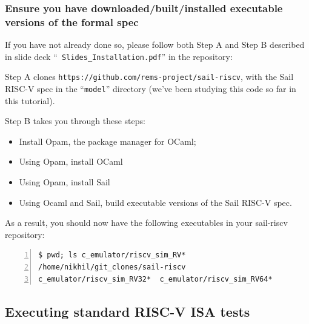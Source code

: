 \documentclass[aspectratio=169]{beamer}
\newcommand{\hmm}{\hspace*{2em}}
\newcommand{\slidefont}{\scriptsize}
\begin{document}

\begin{frame}[fragile]
  \frametitle{Ensure you have downloaded/built/installed executable versions of the formal spec}

  \label{reminder-download-install}

  \slidefont

  If you have not already done so, please follow both Step A and Step B described in slide deck ``{\tt
    Slides\_Installation.pdf}'' in the repository:

  \vspace{1ex}

  \hmm {\tt https://github.com/rsnikhil/RISCV\_ISA\_Spec\_Tour}

  \vspace{1ex}

  Step A clones {\tt https://github.com/rems-project/sail-riscv}, with
  the Sail RISC-V spec in the ``{\tt model}'' directory (we've been
  studying this code so far in this tutorial).

  \vspace{1ex}

  Step B takes you through these steps:
  \begin{itemize}
  \item Install Opam, the package manager for OCaml;
  \item Using Opam, install OCaml
  \item Using Opam, install Sail
  \item Using Ocaml and Sail, build executable versions of the Sail RISC-V spec.
  \end{itemize}

  As a result, you should now have the following executables in your sail-riscv repository:

  \vspace{1ex}

  \begin{Verbatim}[frame=single, numbers=left, label = in your sail-riscv repository clone]
$ pwd; ls c_emulator/riscv_sim_RV*
/home/nikhil/git_clones/sail-riscv
c_emulator/riscv_sim_RV32*  c_emulator/riscv_sim_RV64*
  \end{Verbatim}

\end{frame}


\subsection{Executing standard RISC-V ISA tests}
\end{document}

